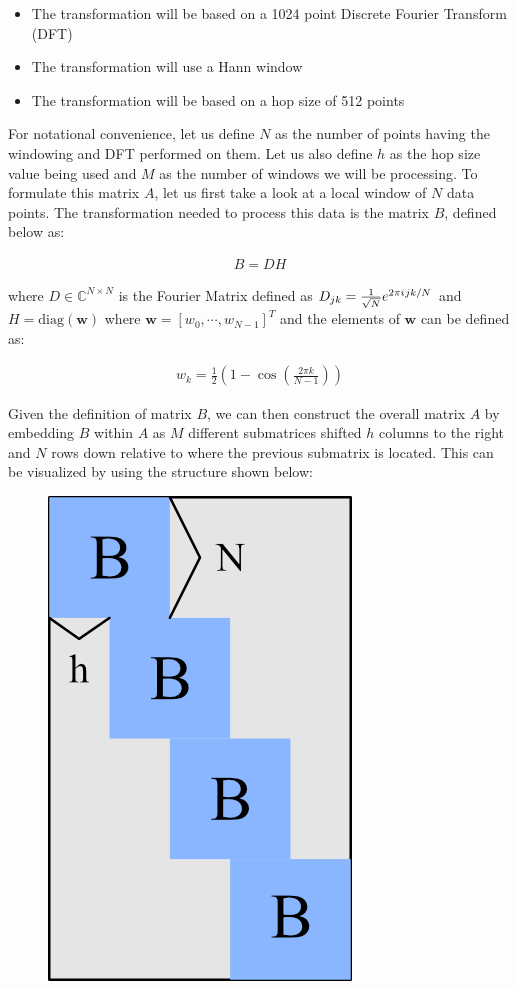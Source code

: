 \documentclass{article}[12pt]
\newcommand{\iu}{{i\mkern1mu}}
\begin{document}
\begin{itemize}
\item The transformation will be based on a 1024 point Discrete Fourier Transform (DFT)
\item The transformation will use a Hann window
\item The transformation will be based on a hop size of 512 points
\end{itemize}

For notational convenience, let us define $N$ as the number of points having the windowing and DFT performed on them. Let us also define $h$ as the hop size value being used and $M$ as the number of windows we will be processing. To formulate this matrix $A$, let us first take a look at a local window of $N$ data points. The transformation needed to process this data is the matrix $B$, defined below as:

\begin{align*}
B = DH
\end{align*}

where $D \in \mathbb{C}^{N \times N}$ is the Fourier Matrix defined as $D_{jk} = \frac{1}{\sqrt{N}}e^{2\pi \iu j k /N  }$ and $H = \text{diag}(\boldsymbol{w})$ where $\boldsymbol{w} = [w_0, \cdots, w_{N-1}]^{T}$ and the elements of $\boldsymbol{w}$ can be defined as:

\begin{align*}
w_k = \frac{1}{2} \left( 1 - \cos\left(\frac{2 \pi k}{N-1}\right)\right)
\end{align*}

\newpage
Given the definition of matrix $B$, we can then construct the overall matrix $A$ by embedding $B$ within $A$ as $M$ different submatrices shifted $h$ columns to the right and $N$ rows down relative to where the previous submatrix is located. This can be visualized by using the structure shown below:

\begin{figure}[h]
\includegraphics[scale=0.4]{block_matrix}
\centering
\end{figure}
\end{document}
